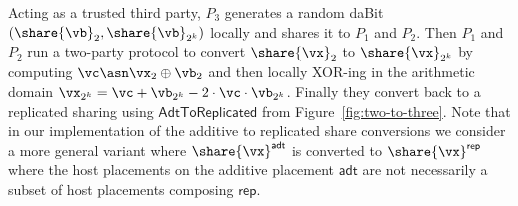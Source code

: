 Acting as a trusted third party, $P_3$ generates a random daBit $(\share{\vb}_2,
\share{\vb}_{2^k})$ locally and shares it to $P_1$ and $P_2$. Then $P_1$ and
$P_2$ run a two-party protocol to convert $\share{\vx}_2$ to $\share{\vx}_{2^k}$
by computing $\vc \asn \vx_2 \oplus \vb_2$ and then locally XOR-ing in the
arithmetic domain $\vx_{2^k} = \vc + \vb_{2^k} - 2 \cdot \vc \cdot \vb_{2^k}$.
Finally they convert back to a replicated sharing using
$\mathsf{AdtToReplicated}$ from Figure~\ref{fig:two-to-three}. Note that in our
implementation of the additive to replicated share conversions we consider a
more general variant where $\share{\vx}^\mathsf{adt}$ is converted to
$\share{\vx}^\mathsf{rep}$ where the host placements on the additive placement
$\mathsf{adt}$ are not necessarily a subset of host placements composing $\mathsf{rep}$.



% 
